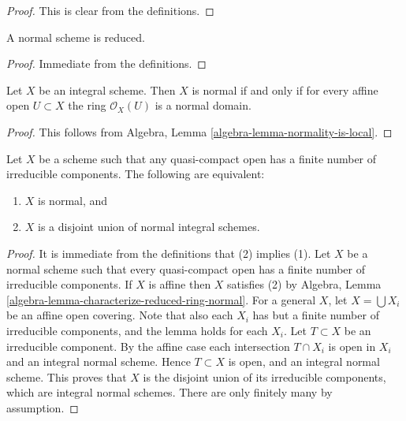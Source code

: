 \begin{proof}
This is clear from the definitions.
\end{proof}

\begin{lemma}
\label{lemma-normal-reduced}
A normal scheme is reduced.
\end{lemma}

\begin{proof}
Immediate from the definitions.
\end{proof}

\begin{lemma}
\label{lemma-integral-normal}
Let $X$ be an integral scheme.
Then $X$ is normal if and only if for every affine open
$U \subset X$ the ring $\mathcal{O}_X(U)$ is a normal domain.
\end{lemma}

\begin{proof}
This follows from
Algebra, Lemma \ref{algebra-lemma-normality-is-local}.
\end{proof}

\begin{lemma}
\label{lemma-normal-locally-finite-nr-irreducibles}
Let $X$ be a scheme such that any quasi-compact open has a finite number
of irreducible components. The following are equivalent:
\begin{enumerate}
\item $X$ is normal, and
\item $X$ is a disjoint union of normal integral schemes.
\end{enumerate}
\end{lemma}

\begin{proof}
It is immediate from the definitions that (2) implies (1).
Let $X$ be a normal scheme such that every quasi-compact open
has a finite number of irreducible components.
If $X$ is affine then $X$ satisfies (2) by
Algebra, Lemma \ref{algebra-lemma-characterize-reduced-ring-normal}.
For a general $X$, let $X = \bigcup X_i$ be
an affine open covering. Note that also each $X_i$ has
but a finite number of irreducible components, and the lemma holds
for each $X_i$. Let $T \subset X$ be an irreducible component.
By the affine case each intersection $T \cap X_i$ is open in $X_i$
and an integral normal scheme.
Hence $T \subset X$ is open, and an integral normal scheme.
This proves that $X$ is the disjoint union of its irreducible components,
which are integral normal schemes. There are only finitely many
by assumption.
\end{proof}

